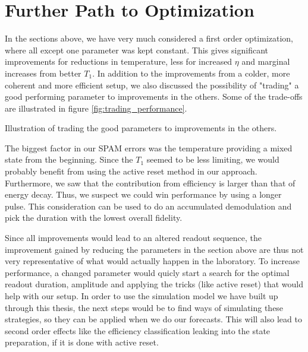 \FloatBarrier

\section{Further Path to Optimization}
In the sections above, we have very much considered a first order optimization, where all except one parameter was kept constant. This gives significant improvements for reductions in temperature, less for increased $\eta$ and marginal increases from better $T_1$. In addition to the improvements from a colder, more coherent and more efficient setup, we also discussed the possibility of "trading" a good performing parameter to improvements in the others. Some of the trade-offs are illustrated in figure \ref{fig:trading_performance}. 

\begin{marginfigure}[- 2 cm]
    \centering
    \caption{Illustration of trading the good parameters to improvements in the others. }
    \label{fig:trading_performance}
\end{marginfigure}

The biggest factor in our SPAM errors was the temperature providing a mixed state from the beginning. Since the $T_1$ seemed to be less limiting, we would probably benefit from using the active reset method in our approach. Furthermore, we saw that the contribution from efficiency is larger than that of energy decay. Thus, we suspect we could win performance by using a longer pulse. This consideration can be used to do an accumulated demodulation and pick the duration with the lowest overall fidelity.

Since all improvements would lead to an altered readout sequence, the improvement gained by reducing the parameters in the section above are thus not very representative of what would actually happen in the laboratory. To increase performance, a changed parameter would quicly start a search for the optimal readout duration, amplitude and applying the tricks (like active reset) that would help with our setup. In order to use the simulation model we have built up through this thesis, the next steps would be to find ways of simulating these strategies, so they can be applied when we do our forecasts. This will also lead to second order effects like the efficiency classification leaking into the state preparation, if it is done with active reset.


